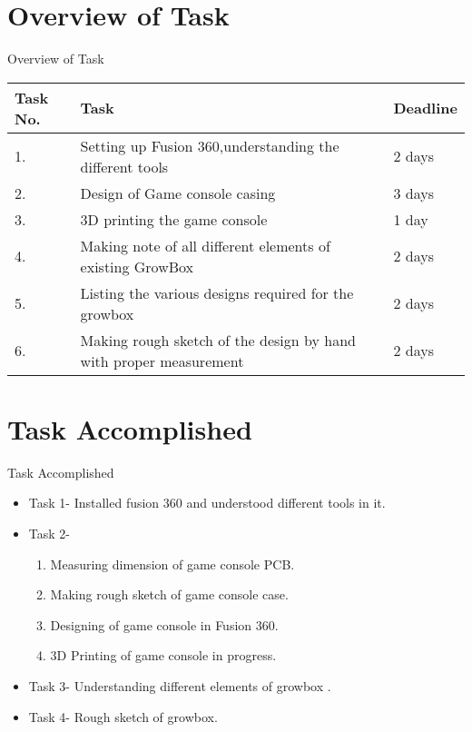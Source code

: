 \documentclass[10pt, a4paper]{beamer}
\begin{document}
\section{Overview of Task}
\begin{frame}{Overview of Task}
	\begin{tabular}{ |p{1.5cm}|p{5cm}|p{1.5cm}|  }
\hline
 
\hline
\textbf{Task No.} & \noindent\hspace{50}\textbf{Task} & \textbf{Deadline}\\
\hline
\noindent\hspace{15}1.& Setting up Fusion 360,understanding the different tools& 2 days \\
\hline
\noindent\hspace{15}2.&Design of Game console  casing& 3 days \\
\hline
\noindent\hspace{15}3.&3D printing the game console & 1 day \\
\hline
\noindent\hspace{15}4.& Making note of all different elements of existing GrowBox & 2 days \\
\hline
\noindent\hspace{15}5.& Listing the various designs required for the growbox & 2 days \\
\hline
\noindent\hspace{15}6.& Making rough sketch of the design by hand with proper measurement & 2 days \\
\hline
\end{tabular}
\end{frame}
 
\section{Task Accomplished}
\begin{frame}{Task Accomplished}
	\begin{itemize}
		\item Task 1- Installed fusion 360 and understood different tools in it.
		\item Task 2-\begin{enumerate}
		\item Measuring dimension of game console PCB.
		\item Making rough sketch of game console case.
		\item Designing of game console in Fusion 360.
		\item 3D Printing of game console in progress.
		\end{enumerate}
		\item Task 3- Understanding different elements of growbox .
		\item Task 4- Rough sketch of growbox.
	\end{itemize}
\end{frame}
 
\end{document}
